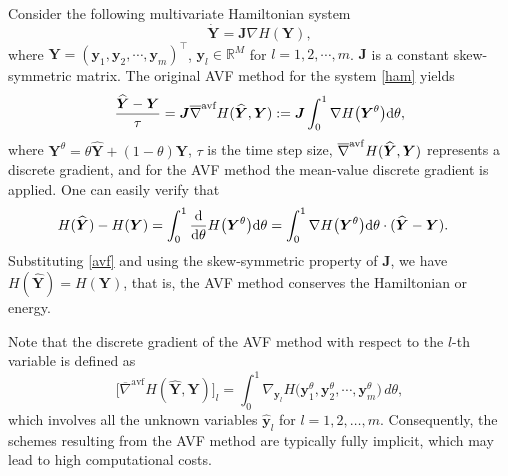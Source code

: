 \documentclass[fleqn,11pt]{elsarticle}
\numberwithin{equation}{section}
\begin{document}
Consider the following multivariate Hamiltonian system
\begin{equation}\label{ham}
	\dot{\bm Y}=\bm J\nabla H(\bm Y),
\end{equation}
where $\bm Y=(\bm y_1, \bm y_2, \cdots, \bm y_m)^\top$, $\bm y_l\in\mathbb{R}^M$ for $l=1,2,\cdots,m$. $\bm J$ is a constant skew-symmetric matrix. The original AVF method for the system \eqref{ham} yields
\begin{equation}\label{avf}
	\frac{\widehat{\bm Y}-\bm Y}{\tau}=\bm J\overline{\nabla}^{\text{avf}}H(\widehat{\bm Y},\bm Y):=\bm J\int_0^1\nabla H\big(\bm Y^\theta\big)\rm d\theta,
\end{equation}
where ${\bm Y}^\theta=\theta\widehat{\bm Y}+(1-\theta)\bm Y$, $\tau$ is the time step size, $\overline{\nabla}^{\rm avf}H(\widehat{\bm Y},\bm Y)$ represents a discrete gradient, and for the AVF method the mean-value discrete gradient is applied. One can easily verify that
\[
	\begin{aligned}
		H(\widehat{\bm Y})-H(\bm Y) & =\int_0^1\frac{\rm d}{\rm d\theta}H\big(\bm Y^\theta\big){\rm d\theta}=\int_0^1\nabla H\big(\bm Y^\theta\big){\rm d}\theta\cdot (\widehat{\bm Y}-\bm Y).
	\end{aligned}
\]
Substituting \eqref{avf} and using the skew-symmetric property of $\bm J$, we have $H(\widehat{\bm Y})=H(\bm Y)$, that is, the AVF method conserves the Hamiltonian or energy.


Note that the discrete gradient of the AVF method with respect to the $ l $-th variable is defined as
\begin{equation}\label{avf-dg}
	\Big[\overline{\nabla}^{\text{avf}} H(\widehat{\bm{Y}}, \bm{Y})\Big]_l = \int_0^1 \nabla_{\bm{y}_l} H\big( \bm{y}_1^\theta, \bm{y}_2^\theta, \cdots, \bm{y}_m^\theta \big) \, d\theta,
\end{equation}
which involves all the unknown variables $\widehat{\bm{y}}_l$ for $l = 1, 2, \ldots, m$. Consequently, the schemes resulting from the AVF method are typically fully implicit, which may lead to high computational costs.
\end{document}

